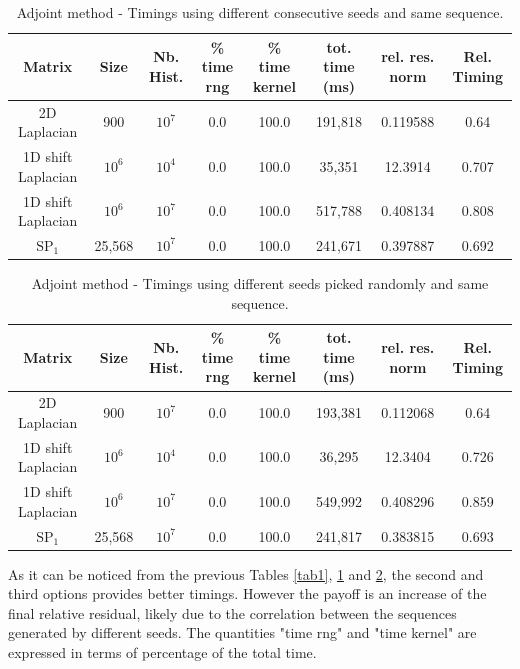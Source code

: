 \documentclass[a4paper,10pt]{article}
\begin{document}
\begin{table}[!h]
\hspace*{-2.5cm}
\begin{tabular}{|c|c|c|c|c|c|c|c|}
\hline
\textbf{Matrix} & \textbf{Size} &\textbf{Nb. Hist.} & \textbf{\% time rng} 
& \textbf{\% time kernel} & tot. time (ms)& rel. res. norm & Rel. Timing\\
\hline
2D Laplacian& 900 & $10^7$ & 0.0 & 100.0 & 191,818 & 0.119588 & 0.64 \\
\hline 
1D shift Laplacian& $10^6$ & $10^4$ & 0.0 & 100.0 & 35,351 & 12.3914 & 0.707\\
\hline
1D shift Laplacian& $10^6$ & $10^7$ & 0.0 & 100.0 & 517,788 & 0.408134 & 
0.808\\
\hline
$\text{SP}_1$ & 25,568 & $10^7$ & 0.0 & 100.0 & 241,671 & 0.397887 & 0.692\\
\hline
\end{tabular}
\caption{Adjoint method - Timings using different consecutive seeds and same 
sequence.} 
\label{tab2}
\end{table}



\begin{table}[!h]
\hspace*{-2.5cm}
\begin{tabular}{|c|c|c|c|c|c|c|c|}
\hline
\textbf{Matrix} & \textbf{Size} &\textbf{Nb. Hist.} & \textbf{\% time rng} 
& \textbf{\% time kernel} & tot. time (ms)& rel. res. norm & Rel. Timing\\
\hline
2D Laplacian& 900 & $10^7$ & 0.0 & 100.0 & 193,381 & 0.112068 & 0.64\\
\hline 
1D shift Laplacian& $10^6$ & $10^4$ & 0.0 & 100.0 & 36,295 & 12.3404 & 0.726\\
\hline
1D shift Laplacian& $10^6$ & $10^7$ & 0.0 & 100.0 & 549,992 & 0.408296 & 
0.859\\
\hline
$\text{SP}_1$ & 25,568 & $10^7$ & 0.0 & 100.0 & 241,817 & 0.383815 & 0.693\\
\hline
\end{tabular}
\caption{Adjoint method - Timings using different seeds picked randomly and 
same 
sequence.} 
\label{tab3}
\end{table}



As it can be noticed from the previous Tables \ref{tab1}, \ref{tab2} and 
\ref{tab3}, the second and third options 
provides better timings. However the payoff 
is an increase of the final relative residual, likely due to the correlation 
between the sequences generated by different seeds.
The quantities "time rng" and "time kernel" are expressed in terms of percentage 
of the total time.
\end{document}
